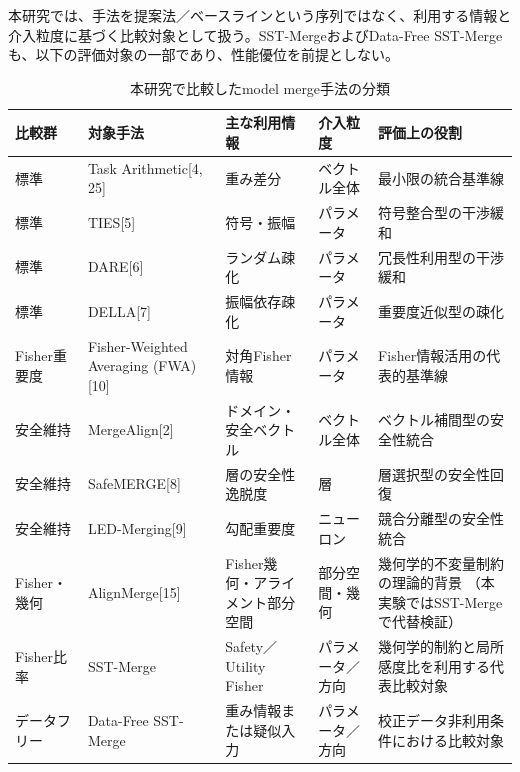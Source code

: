 \documentclass{article}
\begin{document}
本研究では、手法を提案法／ベースラインという序列ではなく、利用する情報と介入粒度に基づく比較対象として扱う。SST-MergeおよびData-Free SST-Mergeも、以下の評価対象の一部であり、性能優位を前提としない。
\begin{table}[t]
\centering
\caption{本研究で比較したmodel merge手法の分類}
\label{tab:baseline_methods}
\small
\begin{tabular}{p{1.8cm}p{2.6cm}p{2.8cm}p{2.3cm}p{4.3cm}}
\toprule
比較群 & 対象手法 & 主な利用情報 & 介入粒度 & 評価上の役割 \\
\midrule

標準 & Task Arithmetic[4, 25] & 重み差分 & ベクトル全体 & 最小限の統合基準線 \\

標準 & TIES[5] & 符号・振幅 & パラメータ & 符号整合型の干渉緩和 \\

標準 & DARE[6] & ランダム疎化 & パラメータ & 冗長性利用型の干渉緩和 \\

標準 & DELLA[7] & 振幅依存疎化 & パラメータ & 重要度近似型の疎化 \\

Fisher重要度 & Fisher-Weighted Averaging (FWA)[10] & 対角Fisher情報 & パラメータ & Fisher情報活用の代表的基準線 \\

安全維持 & MergeAlign[2] & ドメイン・安全ベクトル & ベクトル全体 & ベクトル補間型の安全性統合 \\

安全維持 & SafeMERGE[8] & 層の安全性逸脱度 & 層 & 層選択型の安全性回復 \\

安全維持 & LED-Merging[9] & 勾配重要度 & ニューロン & 競合分離型の安全性統合 \\

Fisher・幾何 & AlignMerge[15] & Fisher幾何・アライメント部分空間 & 部分空間・幾何 & 幾何学的不変量制約の理論的背景
（本実験ではSST-Mergeで代替検証） \\

Fisher比率 & SST-Merge & Safety／Utility Fisher & パラメータ／方向 & 幾何学的制約と局所感度比を利用する代表比較対象 \\

データフリー & Data-Free SST-Merge & 重み情報または疑似入力 & パラメータ／方向 & 校正データ非利用条件における比較対象 \\
\bottomrule
\end{tabular}
\end{table}
\end{document}
